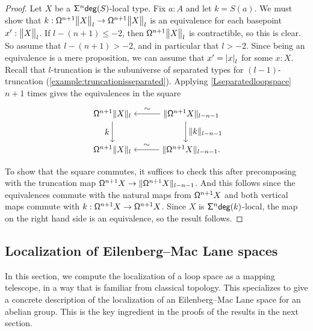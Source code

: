 \begin{proof}
    Let $X$ be a $\suspsym^n \degg(S)$-local type.
    Fix $a : A$ and let $k = S(a)$.
    We must show that $k : \loopspacesym^{n+1} \ttrunc{l}{X} \to \loopspacesym^{n+1} \ttrunc{l}{X}$
    is an equivalence for each basepoint $x' : \ttrunc{l}{X}$.
    If $l - (n+1) \leq -2$, then $\loopspacesym^{n+1} \ttrunc{l}{X}$ is
    contractible, so this is clear.
    So assume that $l - (n+1) > -2$, and in particular that $l > -2$.
    Since being an equivalence is a mere proposition,
    we can assume that $x' = \tproj{l}{x}$ for some $x : X$.
    Recall that $l$-truncation
    is the subuniverse of separated types for $(l-1)$-truncation (\cref{example:truncationisseparated}).
    Applying \cref{Lseparatedloopspace} $n+1$ times gives the equivalences
    in the square
\[
        \begin{tikzpicture}
          \matrix (m) [matrix of math nodes,row sep=2.5em,column sep=3em,minimum width=2em]
          { \loopspacesym^{n+1} \trunc{l}X & \trunc{l-n-1}{\loopspacesym^{n+1} X}\hspace*{-3ex} \\
            \loopspacesym^{n+1} \trunc{l} X & \trunc{l-n-1}{\loopspacesym^{n+1} X} . \hspace*{-3ex} \\};
          \path[->]
            (m-1-1) edge node [left] {$k$} (m-2-1)
            (m-2-2) edge node [above] {$\sim$} (m-2-1)
            (m-1-2) edge node [right]{$\trunc{l-n-1}{k}$} (m-2-2)
                    edge node [above] {$\sim$} (m-1-1)
            ;
        \end{tikzpicture}
    \]
    To show that the square commutes, it suffices to check this after precomposing
    with the truncation map $\loopspacesym^{n+1} X \to \trunc{l-n-1}{\loopspacesym^{n+1} X}$.
    And this follows since the equivalences commute with the natural maps from
    $\loopspacesym^{n+1} X$ and
    both vertical maps commute with $k : \loopspacesym^{n+1} X \to \loopspacesym^{n+1} X$.
    Since $X$ is $\suspsym^n \degg(k)$-local, the map on the right hand side is an equivalence,
    so the result follows.
\end{proof}

\subsection{Localization of Eilenberg--Mac Lane spaces}\label{ss:localizingKgn}

In this section, we compute the localization of a loop space as a mapping telescope,
in a way that is familiar from classical topology.
This specializes to give a concrete description of the
localization of an Eilenberg--Mac Lane space for an abelian group.
This is the key ingredient in the proofs of the results in the next section.

